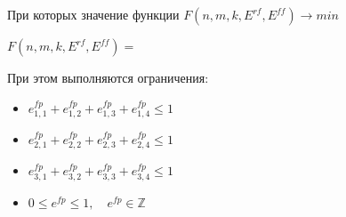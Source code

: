 \documentclass{article}
\begin{document}
  При которых значение функции $F(n, m, k, E^{rf}, E^{ff}) \to min$
  
  \begin{center}
    $F(n, m, k, E^{rf}, E^{ff}) = $











  \end{center}
  
  При этом выполняются ограничения:
  \begin{itemize}
    \item[] $e^{fp}_{1, 1} + e^{fp}_{1, 2} + e^{fp}_{1, 3} + e^{fp}_{1, 4} \leq 1$
    \item[] $e^{fp}_{2, 1} + e^{fp}_{2, 2} + e^{fp}_{2, 3} + e^{fp}_{2, 4} \leq 1$
    \item[] $e^{fp}_{3, 1} + e^{fp}_{3, 2} + e^{fp}_{3, 3} + e^{fp}_{3, 4} \leq 1$
    \item[] $0 \leq e^{fp} \leq 1, \quad e^{fp} \in \mathbb{Z}$
  \end{itemize}
\end{document}
